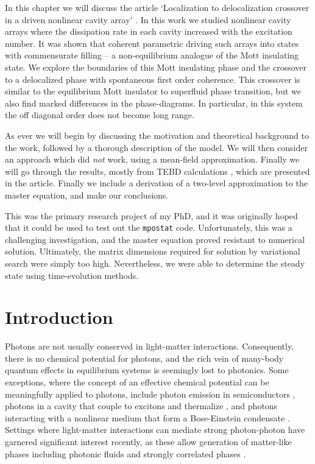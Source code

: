 In this chapter we will discuss the article `Localization to delocalization crossover in a driven nonlinear cavity array' \cite{Brown2018}. In this work we studied nonlinear cavity arrays where the dissipation rate in each cavity increased with the excitation number. It was shown that coherent parametric driving such arrays into states with commensurate filling -- a non-equilibrium analogue of the Mott insulating state. We explore the boundaries of this Mott insulating phase and the crossover to a delocalized phase with spontaneous first order coherence. This crossover is similar to the equilibrium Mott insulator to superfluid phase transition, but we also find marked differences in the phase-diagrams. In particular, in this system the off diagonal order does not become long range.  

As ever we will begin by discussing the motivation and theoretical background to the work, followed by a thorough description of the model. We will then consider an approach which did \emph{not} work, using a mean-field approximation. Finally we will go through the results, mostly from TEBD calculations \cite{Vidal2003}, which are presented in the article. Finally we include a derivation of a two-level approximation to the master equation, and make our conclusions.

This was the primary research project of my PhD, and it was originally hoped that it could be used to test out the \lstinline$mpostat$ code. Unfortunately, this was a challenging investigation, and the master equation proved resistant to numerical solution. Ultimately, the matrix dimensions required for solution by variational search were simply too high. Nevertheless, we were able to determine the steady state using time-evolution methods. 

\section{Introduction}
Photons are not usually conserved in light-matter interactions. Consequently, there is no chemical potential for photons, and the rich vein of many-body quantum effects in equilibrium systems is seemingly lost to photonics. Some exceptions, where the concept of an effective chemical potential can be meaningfully applied to photons, include photon emission in semiconductors \cite{Wurfel1982}, photons in a cavity that couple to excitons and thermalize \cite{Keeling2007,Eastham2001,Carusotto2013}, and photons interacting with a nonlinear medium that form a Bose-Einstein condensate \cite{Kasprzak2006,Klaers2010}. Settings where light-matter interactions can mediate strong photon-photon have garnered significant interest recently, as these allow generation of matter-like phases including photonic fluids \cite{Carusotto2013,Vocke2015} and strongly correlated phases \cite{Hartmann2008,Hartmann2016,Noh2017}.

